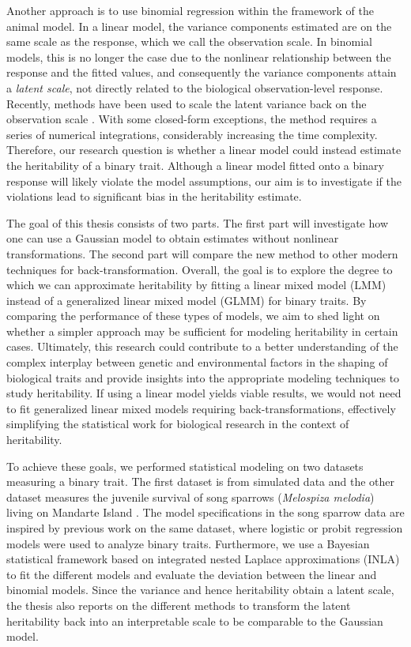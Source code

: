 Another approach is to use binomial regression within the framework of the animal model. %
In a linear model, the variance components estimated are on the same scale as the response, which we call the observation scale. In binomial models, this is no longer the case due to the nonlinear relationship between the response and the fitted values, and consequently the variance components attain a \textit{latent scale}, not directly related to the biological observation-level response. Recently, methods have been used to scale the latent variance back on the observation scale \autocite{de2016general}. With some closed-form exceptions, the method requires a series of numerical integrations, considerably increasing the time complexity. Therefore, our research question is whether a linear model could instead estimate the heritability of a binary trait. Although a linear model fitted onto a binary response will likely violate the model assumptions, our aim is to investigate if the violations lead to significant bias in the heritability estimate.

The goal of this thesis consists of two parts. The first part will investigate how one can use a Gaussian model to obtain estimates without nonlinear transformations. The second part will compare the new method to other modern techniques for back-transformation. Overall, the goal is to explore the degree to which we can approximate heritability by fitting a linear mixed model (LMM) instead of a generalized linear mixed model (GLMM) for binary traits. By comparing the performance of these types of models, we aim to shed light on whether a simpler approach may be sufficient for modeling heritability in certain cases. Ultimately, this research could contribute to a better understanding of the complex interplay between genetic and environmental factors in the shaping of biological traits and provide insights into the appropriate modeling techniques to study heritability. If using a linear model yields viable results, we would not need to fit generalized linear mixed models requiring back-transformations, effectively simplifying the statistical work for biological research in the context of heritability.

To achieve these goals, we performed statistical modeling on two datasets measuring a binary trait. The first dataset is from simulated data and the other dataset measures the juvenile survival of song sparrows (\textit{Melospiza melodia}) living on Mandarte Island \autocite{smith2006}. The model specifications in the song sparrow data are inspired by previous work \autocite{reid2021, rekkebo2021} on the same dataset, where logistic or probit regression models were used to analyze binary traits. Furthermore, we use a Bayesian statistical framework based on integrated nested Laplace approximations (INLA) to fit the different models and evaluate the deviation between the linear and binomial models. Since the variance and hence heritability obtain a latent scale, the thesis also reports on the different methods to transform the latent heritability back into an interpretable scale to be comparable to the Gaussian model.